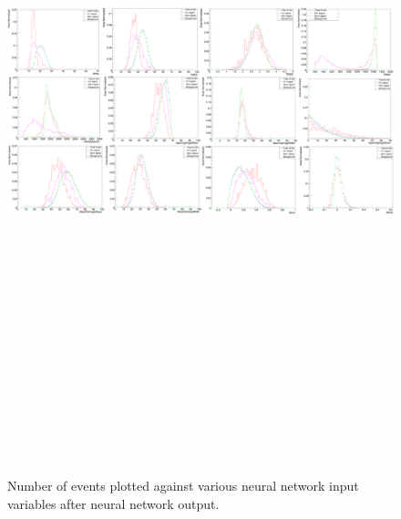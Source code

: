 \begin{landscape}
    \begin{figure}[t]
        \centering
        \hbox{\hspace{-0.5em}\includegraphics[width=24cm,height=21cm,keepaspectratio]{Figures/postNNvariablesbkg.PNG}}
        \caption{Number of events plotted against various neural network input variables after neural network output.}
        \label{fig:post_NN_signal}
    \end{figure}
\end{landscape}



